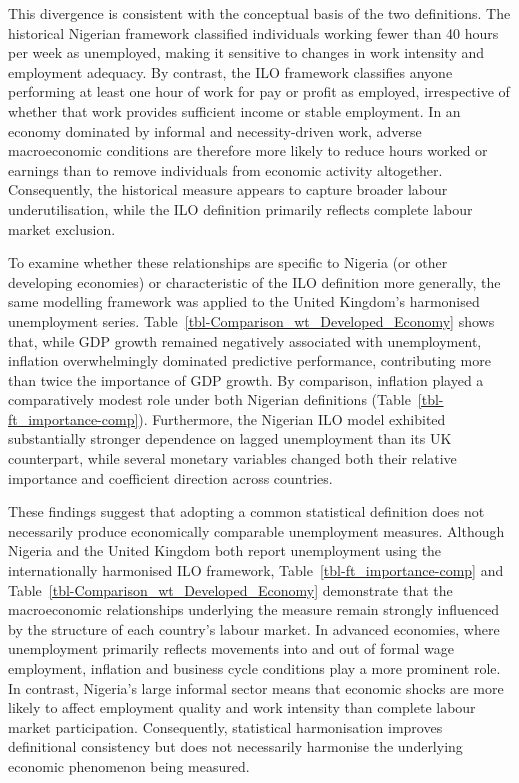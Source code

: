 \documentclass[
  letterpaper,
  DIV=11,
  numbers=noendperiod]{scrartcl}
\begin{document}
This divergence is consistent with the conceptual basis of the two
definitions. The historical Nigerian framework classified individuals
working fewer than 40 hours per week as unemployed, making it sensitive
to changes in work intensity and employment adequacy. By contrast, the
ILO framework classifies anyone performing at least one hour of work for
pay or profit as employed, irrespective of whether that work provides
sufficient income or stable employment. In an economy dominated by
informal and necessity-driven work, adverse macroeconomic conditions are
therefore more likely to reduce hours worked or earnings than to remove
individuals from economic activity altogether. Consequently, the
historical measure appears to capture broader labour underutilisation,
while the ILO definition primarily reflects complete labour market
exclusion.

To examine whether these relationships are specific to Nigeria (or other
developing economies) or characteristic of the ILO definition more
generally, the same modelling framework was applied to the United
Kingdom's harmonised unemployment series.
Table~\ref{tbl-Comparison_wt_Developed_Economy} shows that, while GDP
growth remained negatively associated with unemployment, inflation
overwhelmingly dominated predictive performance, contributing more than
twice the importance of GDP growth. By comparison, inflation played a
comparatively modest role under both Nigerian definitions
(Table~\ref{tbl-ft_importance-comp}). Furthermore, the Nigerian ILO
model exhibited substantially stronger dependence on lagged unemployment
than its UK counterpart, while several monetary variables changed both
their relative importance and coefficient direction across countries.

These findings suggest that adopting a common statistical definition
does not necessarily produce economically comparable unemployment
measures. Although Nigeria and the United Kingdom both report
unemployment using the internationally harmonised ILO framework,
Table~\ref{tbl-ft_importance-comp} and
Table~\ref{tbl-Comparison_wt_Developed_Economy} demonstrate that the
macroeconomic relationships underlying the measure remain strongly
influenced by the structure of each country's labour market. In advanced
economies, where unemployment primarily reflects movements into and out
of formal wage employment, inflation and business cycle conditions play
a more prominent role. In contrast, Nigeria's large informal sector
means that economic shocks are more likely to affect employment quality
and work intensity than complete labour market participation.
Consequently, statistical harmonisation improves definitional
consistency but does not necessarily harmonise the underlying economic
phenomenon being measured.
\end{document}
